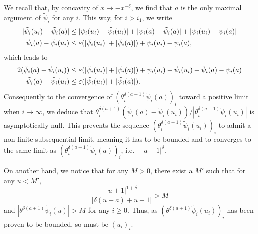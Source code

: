     We recall that, by concavity of $x\mapsto -x^{-\delta}$, we find that $a$ is the only maximal argument of $\tilde\psi_i$ for any $i$. 
    This way, for $i>i_1$, we write
        \begin{align}
            |\tilde\psi_i(u_i)-\tilde\psi_i(a)|&\leq |\psi_i(u_i)-\tilde\psi_i(u_i)| +  |\psi_i(a)-\tilde\psi_i(a)| + |\psi_i(u_i)-\psi_i(a)| \nonumber\\
            \tilde\psi_i(a) - \tilde\psi_i(u_i) &%
            \leq \eps(|\tilde\psi_i(u_i)|+|\tilde\psi_i(a)|)+ \psi_i(u_i)-\psi_i(a),
        \end{align}
    which leads to 
        \begin{align}
            2(\tilde\psi_i(a)-\tilde\psi_i(u_i)) &%
            \leq \eps(|\tilde\psi_i(u_i)|+|\tilde\psi_i(a)|) +  \psi_i(u_i)-\tilde\psi_i(u_i)+\tilde\psi_i(a)-\psi_i(a) \nonumber\\
            \tilde\psi_i(a) - \tilde\psi_i(u_i) &%
            \leq \eps(|\tilde\psi_i(u_i)|+|\tilde\psi_i(a)|).
        \end{align}
    Consequently to the convergence of
     $(\theta_i^{\delta(a+1)}\tilde\psi_i(a))_i$ toward a positive limit when $i\to\infty$, we deduce that $\theta_i^{\delta(a+1)}(\tilde\psi_i(a)-\tilde\psi_i(u_i))/|\theta_i^{\delta(a+1)}\tilde\psi_i(u_i)|$ is asymptotically null. This prevents the sequence $(\theta_i^{\delta(a+1)}\tilde\psi_i(u_i))_i$ to admit a non finite subsequential limit, meaning it has to be bounded and to converges to the same limit as $(\theta_i^{\delta(a+1)}\tilde\psi_i(a))_i$, i.e. $-|a+1|^\delta$.

     On another hand, we notice that for any $M>0$, there exist a $M'$ such that for any $u<M'$, 
        \begin{equation}
            \frac{|u+1|^{1+\delta}}{|\delta(u-a)+u+1|}>M
        \end{equation}
     and $|\theta^{\delta(a+1)}\tilde\psi_i(u)|>M$ for any $i\geq0$. Thus, as $(\theta^{\delta(a+1)}\tilde\psi_i(u_i))_i$ has been proven to be bounded, so must be $(u_i)_i$.

